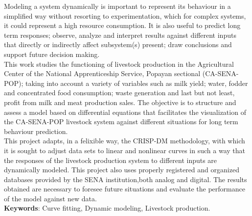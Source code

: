 
Modeling a system dynamically is important to represent its behaviour in a simplified way without resorting to experimentation, which for complex systems, it could represent a high resource consumption. It is also useful to predict long term responses; observe, analyze and interpret results against different inputs that directly or indirectly affect subsystem(s) present; draw conclusions and support future decision making.\\

This work studies the functioning of livestock production in the Agricultural Center of the National Apprenticeship Service, Popayan sectional (CA-SENA-POP); taking into account a variety of variables such as milk yield; water, fodder and concentrated food consumption; waste generation and last but not least, profit from milk and meat production sales. The objective is to structure and assess a model based on differential equations that facilitates the visualization of the CA-SENA-POP livestock system against different situations for long term behaviour prediction.\\

This project adapts, in a felixible way, the CRISP-DM methodology, with which it is sought to adjust
data sets to linear and nonlinear curves in such a way that the responses of the livestock production system to different inputs are dynamically modeled. This project also uses properly registered and organized databases provided by the SENA institution,both analog and digital.
The results obtained are necessary to foresee future situations and evaluate the performance of the model against new data.\\


{\bf Keywords}: Curve fitting, Dynamic modeling, Livestock production.
